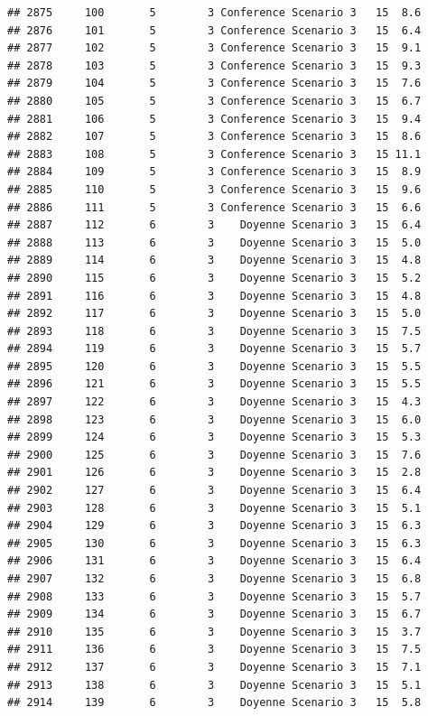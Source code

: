 \documentclass[
]{article}
\begin{document}
\begin{verbatim}
## 2875     100       5        3 Conference Scenario 3   15  8.6
## 2876     101       5        3 Conference Scenario 3   15  6.4
## 2877     102       5        3 Conference Scenario 3   15  9.1
## 2878     103       5        3 Conference Scenario 3   15  9.3
## 2879     104       5        3 Conference Scenario 3   15  7.6
## 2880     105       5        3 Conference Scenario 3   15  6.7
## 2881     106       5        3 Conference Scenario 3   15  9.4
## 2882     107       5        3 Conference Scenario 3   15  8.6
## 2883     108       5        3 Conference Scenario 3   15 11.1
## 2884     109       5        3 Conference Scenario 3   15  8.9
## 2885     110       5        3 Conference Scenario 3   15  9.6
## 2886     111       5        3 Conference Scenario 3   15  6.6
## 2887     112       6        3    Doyenne Scenario 3   15  6.4
## 2888     113       6        3    Doyenne Scenario 3   15  5.0
## 2889     114       6        3    Doyenne Scenario 3   15  4.8
## 2890     115       6        3    Doyenne Scenario 3   15  5.2
## 2891     116       6        3    Doyenne Scenario 3   15  4.8
## 2892     117       6        3    Doyenne Scenario 3   15  5.0
## 2893     118       6        3    Doyenne Scenario 3   15  7.5
## 2894     119       6        3    Doyenne Scenario 3   15  5.7
## 2895     120       6        3    Doyenne Scenario 3   15  5.5
## 2896     121       6        3    Doyenne Scenario 3   15  5.5
## 2897     122       6        3    Doyenne Scenario 3   15  4.3
## 2898     123       6        3    Doyenne Scenario 3   15  6.0
## 2899     124       6        3    Doyenne Scenario 3   15  5.3
## 2900     125       6        3    Doyenne Scenario 3   15  7.6
## 2901     126       6        3    Doyenne Scenario 3   15  2.8
## 2902     127       6        3    Doyenne Scenario 3   15  6.4
## 2903     128       6        3    Doyenne Scenario 3   15  5.1
## 2904     129       6        3    Doyenne Scenario 3   15  6.3
## 2905     130       6        3    Doyenne Scenario 3   15  6.3
## 2906     131       6        3    Doyenne Scenario 3   15  6.4
## 2907     132       6        3    Doyenne Scenario 3   15  6.8
## 2908     133       6        3    Doyenne Scenario 3   15  5.7
## 2909     134       6        3    Doyenne Scenario 3   15  6.7
## 2910     135       6        3    Doyenne Scenario 3   15  3.7
## 2911     136       6        3    Doyenne Scenario 3   15  7.5
## 2912     137       6        3    Doyenne Scenario 3   15  7.1
## 2913     138       6        3    Doyenne Scenario 3   15  5.1
## 2914     139       6        3    Doyenne Scenario 3   15  5.8

\end{verbatim}
\end{document}
